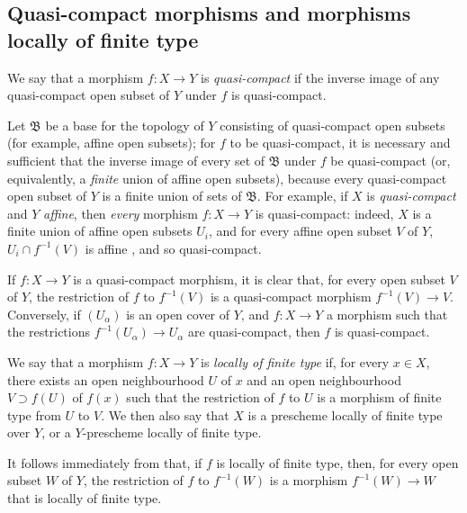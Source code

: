 \subsection{Quasi-compact morphisms and morphisms locally of finite type}
\label{subsection:I.6.6}

\begin{definition}[6.6.1]
\label{I.6.6.1}
We say that a morphism $f:X\to Y$ is \emph{quasi-compact} if the inverse image of any quasi-compact open subset of $Y$ under $f$ is quasi-compact.
\end{definition}

Let $\mathfrak{B}$ be a base for the topology of $Y$ consisting of quasi-compact open subsets (for example, affine open subsets);
for $f$ to be quasi-compact, it is necessary and sufficient that the inverse image of every set of $\mathfrak{B}$ under $f$ be quasi-compact (or, equivalently, a \emph{finite} union of affine open subsets), because every quasi-compact open subset of $Y$ is a finite union of sets of $\mathfrak{B}$.
For example, if $X$ is \emph{quasi-compact} and $Y$ \emph{affine}, then \emph{every} morphism $f: X\to Y$ is quasi-compact:
indeed, $X$ is a finite union of affine open subsets $U_i$, and for every affine open subset $V$ of $Y$, $U_i\cap f^{-1}(V)$ is affine , and so quasi-compact.

If $f: X\to Y$ is a quasi-compact morphism, it is clear that, for every open subset $V$ of $Y$, the restriction of $f$ to $f^{-1}(V)$ is a quasi-compact morphism $f^{-1}(V)\to V$.
Conversely, if $(U_\alpha)$ is an open cover of $Y$, and $f: X\to Y$ a morphism such that the restrictions $f^{-1}(U_\alpha)\to U_\alpha$ are quasi-compact, then $f$ is quasi-compact.

\begin{definition}[6.6.2]
\label{I.6.6.2}
We say that a morphism $f: X\to Y$ is \emph{locally of finite type} if, for every $x\in X$, there exists an open neighbourhood $U$ of $x$ and an open neighbourhood $V\supset f(U)$ of $f(x)$ such that the restriction of $f$ to $U$ is a morphism of finite type from $U$ to $V$.
We then also say that $X$ is a prescheme locally of finite type over $Y$, or a $Y$-prescheme locally of finite type.
\end{definition}

It follows immediately from  that, if $f$ is locally of finite type, then, for every open subset $W$ of $Y$, the restriction of $f$ to $f^{-1}(W)$ is a morphism $f^{-1}(W)\to W$ that is locally of finite type.

